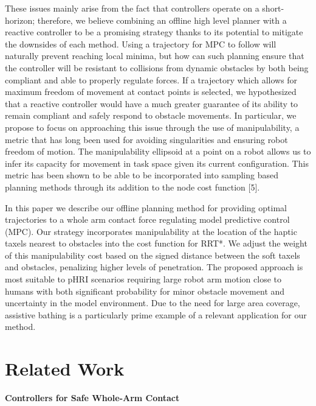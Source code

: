 \documentclass[conference]{IEEEtran}
\begin{document}
These issues mainly arise from the fact that controllers operate on a short-horizon; therefore, we believe combining an offline high level planner with a reactive controller to be a promising strategy thanks to its potential to mitigate the downsides of each method. Using a trajectory for MPC to follow will naturally prevent reaching local minima, but how can such planning ensure that the controller will be resistant to collisions from dynamic obstacles by both being compliant and able to properly regulate forces. If a trajectory which allows for maximum freedom of movement at contact points is selected, we hypothesized that a reactive controller would have a much greater guarantee of its ability to remain compliant and safely respond to obstacle movements. In particular, we propose to focus on approaching this issue through the use of manipulability, a metric that has long been used for avoiding singularities and ensuring robot freedom of motion. The manipulability ellipsoid at a point on a robot allows us to infer its capacity for movement in task space given its current configuration. This metric has been shown to be able to be incorporated into sampling based planning methods through its addition to the node cost function [5].

In this paper we describe our offline planning method for providing optimal trajectories to a whole arm contact force regulating model predictive control (MPC). Our strategy incorporates manipulability at the location of the haptic taxels nearest to obstacles into the cost function for RRT*. We adjust the weight of this manipulability cost based on the signed distance between the soft taxels and obstacles, penalizing higher levels of penetration. The proposed approach is most suitable to pHRI scenarios requiring large robot arm motion close to humans with both significant probability for minor obstacle movement and uncertainty in the model environment. Due to the need for large area coverage, assistive bathing is a particularly prime example of a relevant application for our method.



\section{Related Work}

\textbf{Controllers for Safe Whole-Arm Contact}
\end{document}
